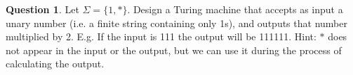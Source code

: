 \documentclass{article}
\theoremstyle{definition}
\newtheorem{Q}{Question}
\newcommand{\tvs}{\textvisiblespace}
\newcommand{\ra}{\rightarrow}
\newcommand{\la}{\leftarrow}
\begin{document}
\begin{Q}
Let $\Sigma=\{1,*\}$. Design a Turing machine that accepts as input a unary number (i.e. a finite string containing only 1s), and outputs that number multiplied by 2. E.g. If the input is 111 the output will be 111111. Hint: $*$ does not appear in the input or the output, but we can use it during the process of calculating the output.
\end{Q}
\begin{comment}
\textbf{Solution}
\begin{center}
\begin{tikzpicture}[scale=0.2]
\tikzstyle{every node}+=[inner sep=0pt]
\draw [black] (14.6,-15.2) circle (3);
\draw (14.6,-15.2) node {$q_0$};
\draw [black] (26.8,-15.2) circle (3);
\draw (26.8,-15.2) node {$q_1$};
\draw [black] (26.8,-25.8) circle (3);
\draw (26.8,-25.8) node {$H$};
\draw [black] (26.8,-25.8) circle (2.4);
\draw [black] (38.3,-15.1) circle (3);
\draw (38.3,-15.1) node {$q_2$};
\draw [black] (52.9,-15.1) circle (3);
\draw (52.9,-15.1) node {$q_3$};
\draw [black] (52.9,-25.8) circle (3);
\draw (52.9,-25.8) node {$q_4$};
\draw [black] (69.3,-25.8) circle (3);
\draw (69.3,-25.8) node {$q_5$};
\draw [black] (17.6,-15.2) -- (23.8,-15.2);
\fill [black] (23.8,-15.2) -- (23,-14.7) -- (23,-15.7);
\draw (20.7,-14.7) node [above] {$:,\ra$};
\draw [black] (26.8,-18.2) -- (26.8,-22.8);
\fill [black] (26.8,-22.8) -- (27.3,-22) -- (26.3,-22);
\draw (26.3,-20.5) node [left] {$\tvs,\tvs$};
\draw [black] (29.8,-15.17) -- (35.3,-15.13);
\fill [black] (35.3,-15.13) -- (34.5,-14.63) -- (34.5,-15.63);
\draw (32.55,-14.63) node [above] {$1,\ast$};
\draw [black] (36.977,-12.42) arc (234:-54:2.25);
\draw (38.3,-7.85) node [above] {$\{1,\ast\},\ra$};
\fill [black] (39.62,-12.42) -- (40.5,-12.07) -- (39.69,-11.48);
\draw [black] (50.209,-16.412) arc (-70.28917:-109.71083:13.666);
\fill [black] (50.21,-16.41) -- (49.29,-16.21) -- (49.62,-17.15);
\draw (45.6,-17.71) node [below] {$\tvs,\ast$};
\draw [black] (55.58,-13.777) arc (144:-144:2.25);
\draw (60.15,-15.1) node [right] {$\ast,\la$};
\fill [black] (55.58,-16.42) -- (55.93,-17.3) -- (56.52,-16.49);
\draw [black] (52.9,-18.1) -- (52.9,-22.8);
\fill [black] (52.9,-22.8) -- (53.4,-22) -- (52.4,-22);
\draw (53.4,-20.45) node [right] {$:,\ra$};
\draw [black] (66.899,-27.585) arc (-60.64203:-119.35797:11.828);
\fill [black] (66.9,-27.58) -- (65.96,-27.54) -- (66.45,-28.41);
\draw (61.1,-29.6) node [below] {$\ast,1$};
\draw [black] (55.359,-24.095) arc (117.75844:62.24156:12.326);
\fill [black] (55.36,-24.1) -- (56.3,-24.16) -- (55.83,-23.28);
\draw (61.1,-22.18) node [above] {$1,\ra$};
\draw [black] (49.9,-25.8) -- (29.8,-25.8);
\fill [black] (29.8,-25.8) -- (30.6,-26.3) -- (30.6,-25.3);
\draw (39.85,-26.3) node [below] {$\tvs,\tvs$};
\draw [black] (41.046,-13.906) arc (107.74904:72.25096:14.937);
\fill [black] (41.05,-13.91) -- (41.96,-14.14) -- (41.66,-13.19);
\draw (45.6,-12.69) node [above] {$1,\ast$};
\end{tikzpicture}
\end{center}
\end{comment}
\end{document}
